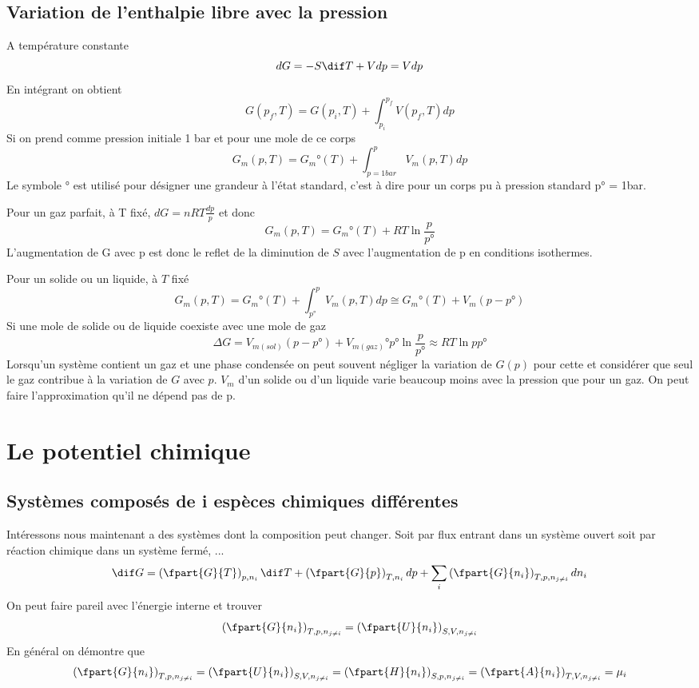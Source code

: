 \subsection{Variation de l'enthalpie libre avec la pression}
A température constante
\[ dG = -S\dif T+Vdp = Vdp \]
En intégrant on obtient
\[ G(p_f,T) = G(p_i,T)+\int_{p_i}^{p_f}V(p_f,T)dp \]
Si on prend comme pression initiale 1 bar et pour une mole de ce corps
\[ G_m(p,T) = G_m°(T)+\int_{p = 1bar}^{p}V_m(p,T)dp \]
Le symbole ° est utilisé pour désigner une grandeur à l'état standard,
c'est à dire pour un corps pu à pression standard p° = 1bar.

Pour un gaz parfait, à T fixé, $dG = nRT\frac{dp}p$ et donc
\[ G_m(p,T) = G_m°(T)+RT \ln \frac {p}{p°} \]
L'augmentation de G avec p est donc le reflet de la diminution de $S$
avec l'augmentation de p en conditions isothermes.

Pour un solide ou un liquide, à $T$ fixé
\[ G_m(p,T) = G_m°(T)+\int_{p°}^{p}V_m(p,T)dp \cong G_m°(T)+V_m(p-p°) \]
Si une mole de solide ou de liquide coexiste avec une mole de gaz
\[ \Delta G =
V_{m(sol)}(p-p°)+V_{m(gaz)}°p°\ln \frac{p}{p°} \approx RT \ln {p}{p°} \]
Lorsqu'un système contient un gaz et une phase condensée
on peut souvent négliger la variation de $G(p)$ pour cette et
considérer que seul le gaz contribue à la variation de $G$ avec $p$.
$V_m$ d'un solide ou d'un liquide varie beaucoup
moins avec la pression que pour un gaz.
On peut faire l'approximation qu'il ne dépend pas de p.

\section{Le potentiel chimique}
\subsection{Systèmes composés de i espèces chimiques différentes}
Intéressons nous maintenant a des systèmes dont la composition peut changer.
Soit par flux entrant dans un système ouvert
soit par réaction chimique dans un système fermé, ...
\[ \dif G = \left(\fpart{G}{T}\right)_{p,n_i}\dif T +
\left(\fpart{G}{p}\right)_{T,n_i}dp +
\sum_i \left(\fpart{G}{n_i}\right)_{T,p,n_{j\neq i}}dn_i \]
On peut faire pareil avec l'énergie interne et trouver
\[ \left(\fpart{G}{n_i}\right)_{T,p,n_{j\neq i}} =
\left(\fpart{U}{n_i}\right)_{S,V,n_{j\neq i}} \]
En général on démontre que
\[ \left(\fpart{G}{n_i}\right)_{T,p,n_{j\neq i}} =
\left(\fpart{U}{n_i}\right)_{S,V,n_{j\neq i}} =
\left(\fpart{H}{n_i}\right)_{S,p,n_{j\neq i}} =
\left(\fpart{A}{n_i}\right)_{T,V,n_{j\neq i}} = \mu_i \]

